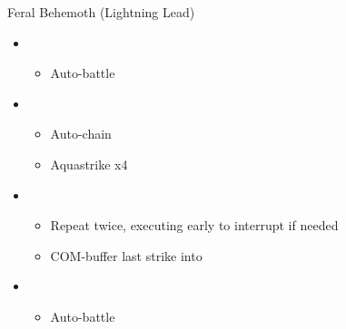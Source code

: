 \begin{battle}{Feral Behemoth (Lightning Lead)}
\begin{itemize}
    \item \first
    \begin{itemize}
        \item Auto-battle
    \end{itemize}
    \item \fourth
    \begin{itemize}
        \item Auto-chain
        \item Aquastrike x4
    \end{itemize}
    \item \fifth
    \begin{itemize}
        \item Repeat twice, executing early to interrupt if needed
        \item COM-buffer last strike into
    \end{itemize}
    \item \first
    \begin{itemize}
        \item Auto-battle
    \end{itemize}
\end{itemize}
\end{battle}

 

